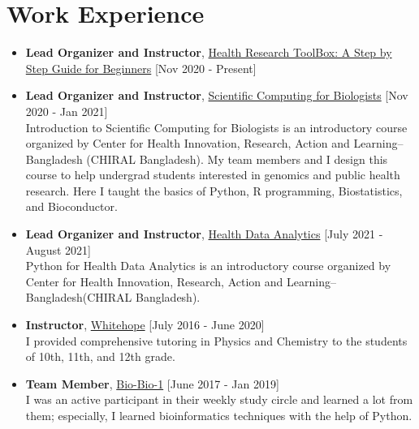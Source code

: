 \documentclass[11pt,a4paper]{moderncv}
\begin{document}
\section{Work Experience}
\begin{itemize}
	\item \textbf{Lead Organizer and Instructor}, 
	\textcolor{blue}{\href{https://scicomforbio.github.io/} {Health Research ToolBox: A Step by Step Guide for Beginners}} \hfil[Nov 2020 - Present] \\
	
	\item \textbf{Lead Organizer and Instructor}, 
	\textcolor{blue}{\href{https://scicomforbio.github.io/}{Scientific Computing for Biologists}} \hfil[Nov 2020 - Jan 2021] \\
	Introduction to Scientific Computing for Biologists is an introductory 
	course organized by Center for Health Innovation, Research, Action and Learning--Bangladesh (CHIRAL Bangladesh). My team members and I design this course to help  undergrad students interested in genomics and
	public health research. Here I taught the basics of Python, R programming, 
	Biostatistics, and Bioconductor. 
	
	\item \textbf{Lead Organizer and Instructor}, 
	\textcolor{blue}{\href{https://scicomforbio.github.io/}{Health Data Analytics}} \hfil[July 2021 - August 2021] \\
	Python for Health Data Analytics is an introductory 
	course organized by Center for Health Innovation, Research, Action and Learning--Bangladesh(CHIRAL Bangladesh).
	\item \textbf{Instructor}, 
	\textcolor{blue}{\href{}{Whitehope}}
	\hfill [July 2016 - June 2020]\\ 
	I provided comprehensive tutoring in Physics and Chemistry to the 
	students of 10th, 11th, and 12th grade.
	
	\item \textbf{Team Member}, 
	\textcolor{blue}{\href{}{Bio-Bio-1}}
	\hfill [June 2017 - Jan 2019]\\ 
	I was an active participant in their weekly study circle and learned a lot 
	from them; especially, I learned bioinformatics techniques with the 
	help of Python.
	
\end{itemize}
\end{document}
